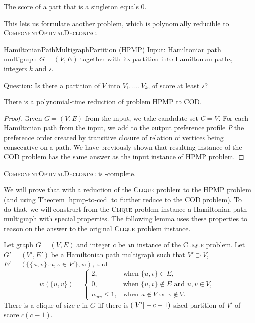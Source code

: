 \begin{rmrk}
The score of a part that is a singleton equals $0$.
\end{rmrk}

This lets us formulate another problem, which is polynomially reducible
to \textsc{ComponentOptimalDecloning}.

\begin{problem}{HamiltonianPathMultigraphPartition (HPMP)}
	Input: Hamiltonian path multigraph $G=(V,E)$
		together with its partition into Hamiltonian paths, integers $k$ and $s$.

	Question: Is there a partition of $V$ into $V_1, ..., V_k$,
        of score at least $s$?
\end{problem}

\begin{thm} \label{hpmp-to-cod}
There is a polynomial-time reduction of problem \textsc{HPMP} to \textsc{COD}.
\end{thm}

\begin{proof}
Given $G=(V,E)$ from the input, we take candidate set $C=V$.
For each Hamiltonian path from the input, we add to the output preference profile $P$
the preference order created by transitive closure of relation of vertices being consecutive on a path.
We have previously shown that resulting instance of the \textsc{COD} problem 
has the same answer as the input instance of \textsc{HPMP} problem.
\end{proof}


\begin{thm} \label{ultimate-theorem}
\textsc{ComponentOptimalDecloning} is \np-complete.
\end{thm}

We will prove that with a reduction of the \textsc{Clique} problem to the \textsc{HPMP} problem
(and using Theorem \ref{hpmp-to-cod} to further reduce to the \textsc{COD} problem).
To do that, we will construct from the \textsc{Clique} problem instance
a Hamiltonian path multigraph with special properties.
The following lemma uses these properties to reason on the answer to the original \textsc{Clique} problem instance.

\begin{lmm} \label{hpmp-red}
Let graph $G = (V, E)$ and integer $c$ be an instance of the \textsc{Clique} problem.
Let $G'=(V',E')$ be a Hamiltonian path multigraph
such that $V' \supset V$, $E'=(\{\{u,v\}: u,v \in V'\}, w)$, and
$$ w(\{u,v\}) =
\begin{cases}
2, 				&\text{when } \{u,v\} \in E ,\\
0, 				&\text{when } \{u,v\} \not\in E \text{ and } u,v \in V ,\\
w_{u v}\leq 1,	&\text{when } u \not\in V \text{ or } v \not\in V.
\end{cases}
$$
There is a clique of size $c$ in $G$ iff
there is $\left(\left\vert V' \right\vert-c-1\right)$-sized partition of $V'$ of score $c(c-1)$.
\end{lmm}

